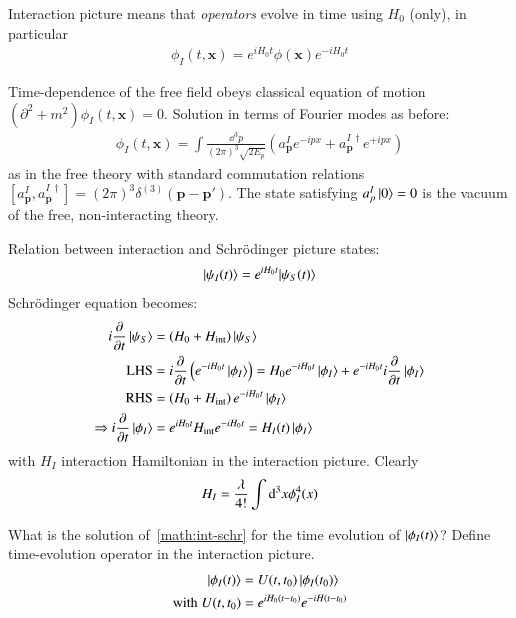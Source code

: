 Interaction picture means that \textit{operators} evolve in time using $H_0$ (only), in particular 
\begin{align}
	\phi_I(t,\pmb{x}) = e^{iH_0t}\phi(\pmb{x})e^{-iH_0t}
\end{align}

Time-dependence of the free field obeys classical equation of motion $\left(\partial^2+m^2 \right)\phi_I(t,\pmb{x}) = 0$. Solution in terms of Fourier modes as before:
\begin{align}
	\phi_I(t,\pmb{x}) = \int \frac{\dd^3 p}{(2\pi)^3\sqrt{2E_p}} (a^I_{\pmb{p}}e^{-ipx} + a^{I\,\dagger}_{\pmb{p}}e^{+ipx})
\end{align}
as in the free theory with standard commutation relations $[a^I_{\pmb{p}}, a^{I\,\dagger}_{\pmb{p}}] = (2\pi)^3\delta^{(3)}(\pmb{p}-\pmb{p}')$. The state satisfying $a^I_p \ket{0} = 0$ is the vacuum of the free, non-interacting theory.

Relation between interaction and Schrödinger picture states:
\begin{align}
	\ket{\psi_I(t)} = e^{iH_0t}{\ket{\psi_S(t)}}
\end{align}
Schrödinger equation becomes: 
\begin{align}
	i\frac{\partial}{\partial t}\ket{\psi_S} &= (H_0 + H_\text{int})\ket{\psi_S} \notag\\
	\text{LHS} &= i \frac{\partial}{\partial t} \left( e^{-iH_0t}\ket{\phi_I} \right) = H_0 e^{-iH_0t}\ket{\phi_I} + e^{-iH_0t}i\frac{\partial}{\partial t}\ket{\phi_I} \notag\\
	\text{RHS}														&= \left(H_0 + H_\text{int}\right)e^{-iH_0t}\ket{\phi_I} \notag\\
	\Rightarrow i\frac{\partial}{\partial t}\ket{\phi_I} &= e^{iH_0t}H_\text{int} e^{-iH_0t} = H_I(t)\ket{\phi_I} \label{math:int-schr}
\end{align}
with $H_I$ interaction Hamiltonian in the interaction picture. Clearly
\begin{align}
	H_I = \frac{\lambda}{4!}\int\dd^3x\phi_I^4(x) \notag
\end{align}

What is the solution of~\ref{math:int-schr} for the time evolution of $\ket{\phi_I(t)}$? Define time-evolution operator in the interaction picture.
\begin{align}
	\ket{\phi_I(t)} &= U(t,t_0)\ket{\phi_I(t_0)}\label{math:int-schr2}\\
	\text{with} \; U(t,t_0) &= e^{iH_0(t-t_0)}e^{-iH(t-t_0)} 
\end{align}

